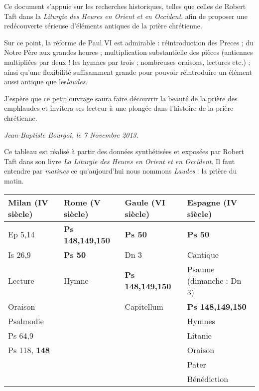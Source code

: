 \documentclass[oneside, 10pt]{article}
\begin{document}
Ce document s'appuie sur les recherches historiques, telles que celles de Robert Taft dans la \textit{Liturgie des Heures en Orient et en Occident}, afin de proposer une redécouverte sérieuse d'éléments antiques de la prière chrétienne.

Sur ce point, la réforme de Paul VI est admirable : réintroduction des Preces ; du Notre Père aux grandes heures ; multiplication substantielle des pièces (antiennes multipliées par deux ! les hymnes  par trois ; nombreuses oraisons, lectures etc.) ; ainsi qu'une flexibilité suffisamment grande pour pouvoir réintroduire un élément aussi antique que les\emph{laudes}.

J'espère que ce petit ouvrage saura faire découvrir la beauté de la prière des emph{laudes} et invitera ses lecteur à une plongée dans l'histoire de la prière chrétienne.

\hfill \textit{Jean-Baptiste Bourgoi, le 7 Novembre 2013.}

\newpage
{}

Ce tableau est réalisé à partir des données synthétisées et exposées par Robert Taft dans son livre \emph{La Liturgie des Heures en Orient et en Occident}. Il faut entendre par \emph{matines} ce qu'aujourd'hui nous nommons \emph{Laudes} : la prière du matin.

\begin{center}
\begin{tabular}{ | l | l | l | l | }
\hline
Milan (IV\up{ème} siècle) & Rome (V\up{ème} siècle)    & Gaule (VI\up{ème} siècle)    & Espagne (IV\up{ème} siècle)\\
\hline
Ep 5,14                & \textbf{Ps 148,149,150} & \textbf{Ps 50}            & \textbf{Ps 50}\\
Is 26,9                & \textbf{Ps 50}          & Dn 3                      & Cantique\\
Lecture                & Hymne                   & \textbf{Ps 148,149,150}   & Psaume (dimanche : Dn 3)\\
Oraison                &                         & Capitellum                & \textbf{Ps 148,149,150}\\
Psalmodie              &                         &                           & Hymnes\\
Ps 64,9                &                         &                           & Litanie\\
Ps 118, \textbf{148}   &                         &                           & Oraison\\
                       &                         &                           & Pater\\
                       &                         &                           & Bénédiction\\
\hline
\end{tabular}
\end{center}
   
\end{document}
